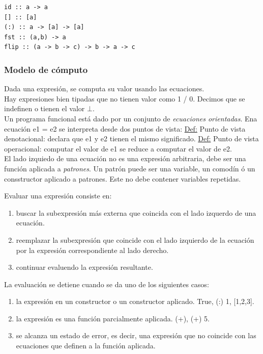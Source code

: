\documentclass[12pt]{extarticle}
\def\definicion{\newline\underline{Def:} }
\begin{document}
\begin{verbatim}
id :: a -> a
[] :: [a]
(:) :: a -> [a] -> [a]
fst :: (a,b) -> a
flip :: (a -> b -> c) -> b -> a -> c
\end{verbatim}

\subsubsection{Modelo de cómputo}
Dada una expresión, se computa su valor usando las ecuaciones. \\
Hay expresiones bien tipadas que no tienen valor como 1 / 0. Decimos que se indefinen o tienen el valor $\bot$. \\
Un programa funcional está dado por un conjunto de \textit{ecuaciones orientadas}. Ena ecuación e1 = e2 se interpreta desde dos puntos de vista:
\definicion Punto de vista denotacional: declara que e1 y e2 tienen el mismo significado.
\definicion Punto de vista operacional: computar el valor de e1 se reduce a computar el valor de e2. \\
El lado izquiedo de una ecuación no es una expresión arbitraria, debe ser una función aplicada a \textit{patrones}. Un patrón puede ser una variable, un comodín ó un consstructor aplicado a patrones. Este no debe contener variables repetidas.

Evaluar una expresión consiste en:
\begin{enumerate}
\itemsep-0.35em 
\item buscar la subexpresión más externa que coincida con el lado izquerdo de una ecuación.
\item reemplazar la subexpresión que coincide con el lado izquierdo de la ecuación por la expresión correspondiente al lado derecho.
\item continuar evaluendo la expresión resultante.
\end{enumerate}

La evaluación se detiene cuando se da uno de los siguientes casos:
\begin{enumerate}
\itemsep-0.35em 
\item la expresión en un constructor o un constructor aplicado. True, (:) 1, [1,2,3].
\item la expresión es una función parcialmente aplicada. (+), (+) 5.
\item se alcanza un estado de error, es decir, una expresión que no coincide con las ecuaciones que definen a la función aplicada.
\end{enumerate}
\end{document}
